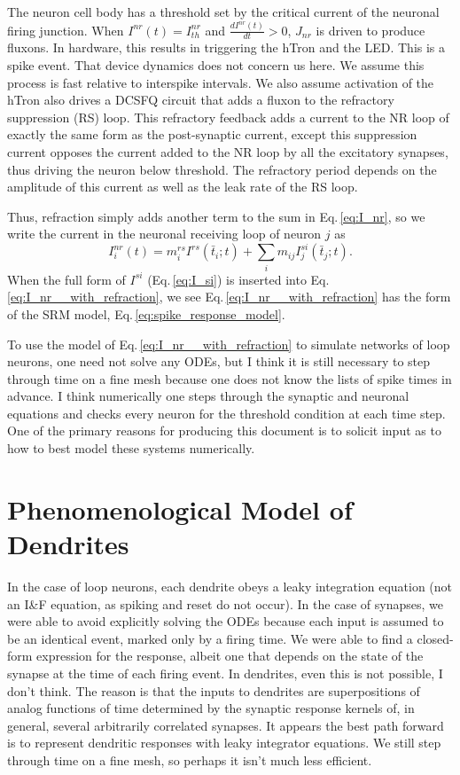\documentclass[]{article}
\begin{document}
The neuron cell body has a threshold set by the critical current of the neuronal firing junction. When $I^{nr}(t) = I^{nr}_{th}$ and $\frac{dI^{nr}(t)}{dt} > 0$, $J_{nr}$ is driven to produce fluxons. In hardware, this results in triggering the hTron and the LED. This is a spike event. That device dynamics does not concern us here. We assume this process is fast relative to interspike intervals. We also assume activation of the hTron also drives a DCSFQ circuit that adds a fluxon to the refractory suppression (RS) loop. This refractory feedback adds a current to the NR loop of exactly the same form as the post-synaptic current, except this suppression current opposes the current added to the NR loop by all the excitatory synapses, thus driving the neuron below threshold. The refractory period depends on the amplitude of this current as well as the leak rate of the RS loop.

Thus, refraction simply adds another term to the sum in Eq.\,\ref{eq:I_nr}, so we write the current in the neuronal receiving loop of neuron $j$ as
\begin{equation}
\label{eq:I_nr__with_refraction}
I_i^{nr}(t) = m_i^{rs}I^{rs}(\bar{t}_i;t)+\sum_i m_{ij} I_j^{si}(\bar{t}_j;t).
\end{equation}
When the full form of $I^{si}$ (Eq.\,\ref{eq:I_si}) is inserted into Eq.\,\ref{eq:I_nr__with_refraction}, we see Eq.\,\ref{eq:I_nr__with_refraction} has the form of the SRM model, Eq.\,\ref{eq:spike_response_model}.

To use the model of Eq.\,\ref{eq:I_nr__with_refraction} to simulate networks of loop neurons, one need not solve any ODEs, but I think it is still necessary to step through time on a fine mesh because one does not know the lists of spike times in advance. I think numerically one steps through the synaptic and neuronal equations and checks every neuron for the threshold condition at each time step. One of the primary reasons for producing this document is to solicit input as to how to best model these systems numerically.

\section{\label{sec:dendrites}Phenomenological Model of Dendrites}
In the case of loop neurons, each dendrite obeys a leaky integration equation (not an I\&F equation, as spiking and reset do not occur). In the case of synapses, we were able to avoid explicitly solving the ODEs because each input is assumed to be an identical event, marked only by a firing time. We were able to find a closed-form expression for the response, albeit one that depends on the state of the synapse at the time of each firing event. In dendrites, even this is not possible, I don't think. The reason is that the inputs to dendrites are superpositions of analog functions of time determined by the synaptic response kernels of, in general, several arbitrarily correlated synapses. It appears the best path forward is to represent dendritic responses with leaky integrator equations. We still step through time on a fine mesh, so perhaps it isn't much less efficient.
\end{document}
